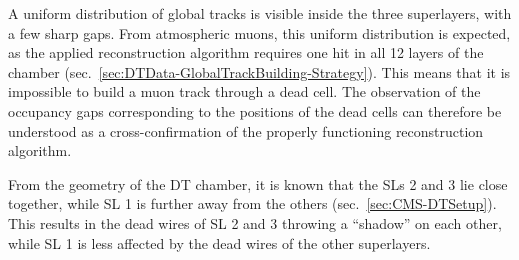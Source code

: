 \par A uniform distribution of global tracks is visible inside the three superlayers, with a few sharp gaps. From atmospheric muons, this uniform distribution is expected, as the applied reconstruction algorithm requires one hit in all 12 layers of the chamber (sec.\ \ref{sec:DTData-GlobalTrackBuilding-Strategy}). This means that it is impossible to build a muon track through a dead cell. The observation of the occupancy gaps corresponding to the positions of the dead cells can therefore be understood as a cross-confirmation of the properly functioning reconstruction algorithm.
\par From the geometry of the \ac{DT} chamber, it is known that the \acp{SL} 2 and 3 lie close together, while \ac{SL} 1 is further away from the others (sec.\ \ref{sec:CMS-DTSetup}). This results in the dead wires of \ac{SL} 2 and 3 throwing a \enquote{shadow} on each other, while \ac{SL} 1 is less affected by the dead wires of the other superlayers.
